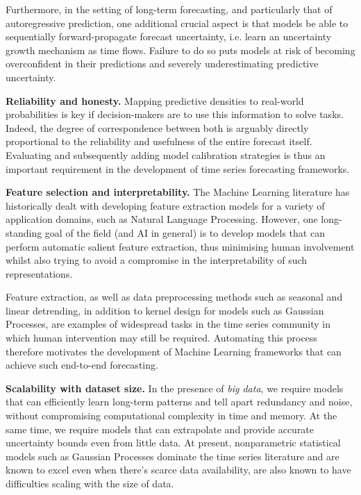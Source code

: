 \documentclass[pdftex,12pt,a4paper]{article}
\theoremstyle{definition}
\theoremstyle{remark}
\begin{document}
Furthermore, in the setting of long-term forecasting, and particularly that of autoregressive prediction, one additional crucial aspect is that models be able to sequentially forward-propagate forecast uncertainty, i.e. learn an uncertainty growth mechanism as time flows. Failure to do so puts models at risk of becoming overconfident in their predictions and severely underestimating predictive uncertainty. 
    
\textbf{Reliability and honesty.} Mapping predictive densities to real-world probabilities is key \citep{guo2017calibration} if decision-makers are to use this information to solve tasks. Indeed, the degree of correspondence between both is arguably directly proportional to the reliability and usefulness of the entire forecast itself. Evaluating and subsequently adding model calibration strategies is thus an important requirement in the development of time series forecasting frameworks.

\textbf{Feature selection and interpretability.} The Machine Learning literature has historically dealt with developing feature extraction models for a variety of application domains, such as Natural Language Processing. However, one long-standing goal of the field  (and AI in general) is to develop models that can perform automatic salient feature extraction, thus minimising human involvement whilst also trying to avoid a compromise in the interpretability of such representations. 

Feature extraction, as well as data preprocessing methods such as seasonal and linear detrending, in addition to kernel design for models such as Gaussian Processes, are examples of widespread tasks in the time series community in which human intervention may still be required. Automating this process therefore motivates the development of Machine Learning frameworks that can achieve such end-to-end forecasting.

\textbf{Scalability with dataset size.} In the presence of \textit{big data}, we require models that can efficiently learn long-term patterns and tell apart redundancy and noise, without compromising computational complexity in time and memory. At the same time, we require models that can extrapolate and provide accurate uncertainty bounds even from little data. At present, nonparametric statistical models such as Gaussian Processes dominate the time series literature and are known to excel even when there's scarce data availability,  are also known to have difficulties scaling with the size of data.
\end{document}
